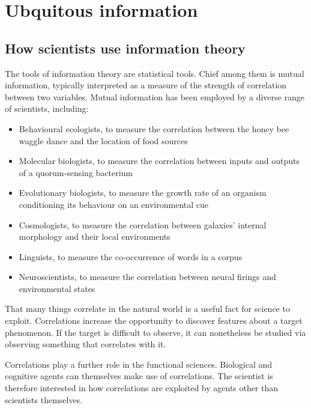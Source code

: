 \section{Ubquitous information}\label{sec:ubiquitous}

\subsection{How scientists use information theory}\label{subsec:scientists}

The tools of information theory are statistical tools.
Chief among them is mutual information, typically interpreted as a measure of the strength of correlation between two variables.
Mutual information has been employed by a diverse range of scientists, including:

\begin{itemize}
    \item Behavioural ecologists, to measure the correlation between the honey bee waggle dance and the location of food sources \citep{haldane1954statistical}
    \item Molecular biologists, to measure the correlation between inputs and outputs of a quorum-sensing bacterium \citep{mehta2009information}
    \item Evolutionary biologists, to measure the growth rate of an organism conditioning its behaviour on an environmental cue \citep{donaldson-matasci2010fitness}
    \item Cosmologists, to measure the correlation between galaxies' internal morphology and their local environments \citep{pandey2017how}
    \item Linguists, to measure the co-occurrence of words in a corpus \citep[$\S$4]{hunston2002corpora}
    \item Neuroscientists, to measure the correlation between neural firings and environmental states \citep[][and references therein]{rathkopf2017neural}
\end{itemize}

\noindent That many things correlate in the natural world is a useful fact for science to exploit.
Correlations increase the opportunity to discover features about a target phenomenon.
If the target is difficult to observe, it can nonetheless be studied via observing something that correlates with it. 

Correlations play a further role in the functional sciences.
Biological and cognitive agents can themselves make use of correlations.
The scientist is therefore interested in how correlations are exploited by agents other than scientists themselves.


